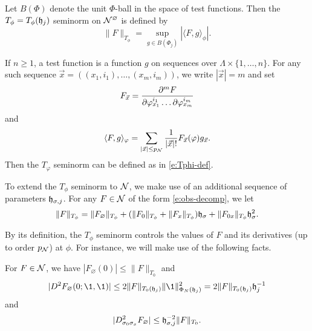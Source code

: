 Let $B(\Phi)$ denote the unit $\Phi$-ball in the space of test functions. Then the
$T_\phi = T_\phi(\mathfrak{h}_j)$ seminorm on $\mathcal{N}^\varnothing$ is defined by
\begin{equation}
\label{e:Tphi-def}
\|F\|_{T_\phi} = \sup_{g\in B(\Phi_j)} |\langle F, g \rangle_\phi|.
\end{equation}

\begin{rk}
\label{rk:Tphi-n}
If $n \ge 1$, a test function is a function $g$ on sequences over $\Lambda\times\{1,\ldots,n\}$.
For any such sequence $\vec x = ((x_1, i_1), \ldots, (x_m, i_m))$, we write $|\vec x| = m$
and set
\begin{equation}
F_{\vec x}
	=
\frac{\partial ^m F}{\partial \varphi^{i_1}_{x_1} \ldots \partial\varphi^{i_m}_{x_m}}
\end{equation}
and
\begin{equation}
\label{e:pairing-boson}
\langle F, g \rangle_\varphi
	=
\sum_{|\vec x| \le p_{\mathcal{N}}} \frac{1}{|\vec x|!} F_{\vec x}(\varphi) g_{\vec x}.
\end{equation}
Then the $T_\varphi$ seminorm can be defined as in \eqref{e:Tphi-def}.
\end{rk}

To extend the $T_\phi$ seminorm to $\mathcal{N}$, we make use of an additional sequence
of parameters $\mathfrak{h}_{\sigma,j}$. For any $F \in \mathcal{N}$ of the form \eqref{e:obs-decomp},
we let
\begin{equation}
\|F\|_{T_\phi}
	=
\|F_\varnothing\|_{T_\phi}
	+ (\|F_0\|_{T_\phi} + \|F_x\|_{T_\phi}) \mathfrak{h}_\sigma
	+ \|F_{0x}\|_{T_\phi} \mathfrak{h}_\sigma^2.
\end{equation}

By its definition, the $T_\phi$ seminorm controls the values of $F$ and its derivatives
(up to order $p_{\mathcal{N}}$) at $\phi$. For instance, we will make use of the following facts.

\begin{lemma}
\label{lem:deriv-norm-bds}
For $F \in \mathcal{N}$, we have $|F_\varnothing(0)| \le \|F\|_{T_0}$ and
\begin{equation}
\label{e:deriv-norm-bd}
|D^2 F_\varnothing(0; \1, \1)|
	\le
2 \|F\|_{T_0(\h_j)} \|\1\|^2_{\Phi_N(\h_j)}
	=
2 \|F\|_{T_0(\h_j)} \h_j^{-1}
\end{equation}
and
\begin{equation}
|D^2_{\sigma_0\sigma_x} F_\varnothing|
	\le
\mathfrak{h}_{\sigma,j}^{-2} \|F\|_{T_0}.
\end{equation}
\end{lemma}

